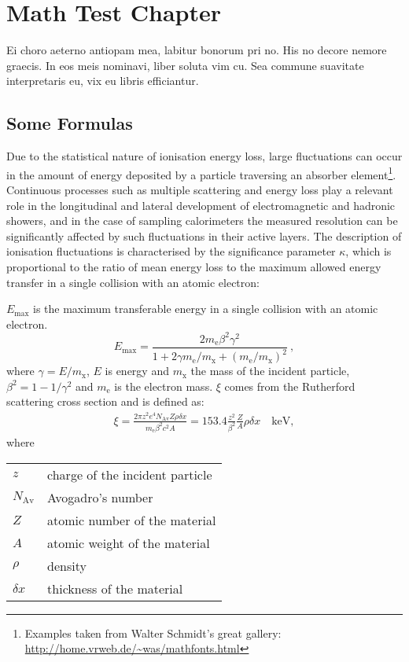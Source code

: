 \chapter{Math Test Chapter}\label{ch:mathtest} %
Ei choro aeterno antiopam mea, labitur bonorum pri no. His no decore
nemore graecis. In eos meis nominavi, liber soluta vim cu. Sea commune
suavitate interpretaris eu, vix eu libris efficiantur.

\section{Some Formulas}
Due to the statistical nature of ionisation energy loss, large
fluctuations can occur in the amount of energy deposited by a particle
traversing an absorber element\footnote{Examples taken from Walter
Schmidt's great gallery: \\
\url{http://home.vrweb.de/~was/mathfonts.html}}.  Continuous processes
such as multiple
scattering and energy loss play a relevant role in the longitudinal
and lateral development of electromagnetic and hadronic
showers, and in the case of sampling calorimeters the
measured resolution can be significantly affected by such fluctuations
in their active layers.  The description of ionisation fluctuations is
characterised by the significance parameter $\kappa$, which is
proportional to the ratio of mean energy loss to the maximum allowed
energy transfer in a single collision with an atomic electron:


$E_{\textrm{max}}$ is the maximum transferable energy in a single
collision with an atomic electron.
\[
E_{\textrm{max}} =\frac{2 m_{\textrm{e}} \beta^2\gamma^2 }{1 +
2\gamma m_{\textrm{e}}/m_{\textrm{x}} + \left ( m_{\textrm{e}}
/m_{\textrm{x}}\right)^2}\ ,
\]
where $\gamma = E/m_{\textrm{x}}$, $E$ is energy and
$m_{\textrm{x}}$ the mass of the incident particle,
$\beta^2 = 1 - 1/\gamma^2$ and $m_{\textrm{e}}$ is the electron mass.
$\xi$ comes from the Rutherford scattering cross section
and is defined as:
\begin{eqnarray*} \xi  = \frac{2\pi z^2 e^4 N_{\textrm{Av}} Z \rho
\delta x}{m_{\textrm{e}} \beta^2 c^2 A} =  153.4 \frac{z^2}{\beta^2}
\frac{Z}{A}
  \rho \delta x \quad\textrm{keV},
\end{eqnarray*}
where

\begin{tabular}{ll}
$z$          & charge of the incident particle \\
$N_{\textrm{Av}}$     & Avogadro's number \\
$Z$          & atomic number of the material \\
$A$          & atomic weight of the material \\
$\rho$       & density \\
$ \delta x$  & thickness of the material \\
\end{tabular}


